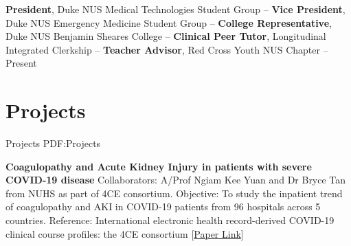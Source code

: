 \documentclass[letterpaper,10pt,oneside]{article}
\begin{document}
\begin{body}
\textbf{President}, Duke NUS Medical Technologies Student Group
\hfill
{} --  
\GapNoBreak
\textbf{Vice President}, Duke NUS Emergency Medicine Student Group
\hfill
{} --  
\GapNoBreak
\textbf{College Representative}, Duke NUS Benjamin Sheares College
\hfill
{} --  
\GapNoBreak
\textbf{Clinical Peer Tutor}, Longitudinal Integrated Clerkship
\hfill
{} --  
\GapNoBreak
\textbf{Teacher Advisor}, Red Cross Youth NUS Chapter
\hfill
{} -- Present




\section
{Projects}
{Projects}
{PDF:Projects}

\textbf{Coagulopathy and Acute Kidney Injury in patients with severe COVID-19 disease}
\BulletItem Collaborators: A/Prof Ngiam Kee Yuan and Dr Bryce Tan from NUHS as part of 4CE consortium.
\BulletItem Objective: To study the inpatient trend of coagulopathy and AKI in COVID-19 patients from 96 hospitals across 5 countries.
\BulletItem Reference: International electronic health record-derived COVID-19 clinical course profiles: the 4CE consortium [\href{https://www.nature.com/articles/s41746-020-00308-0}{Paper Link}]
\GapNoBreak






\end{body}
\end{document}
